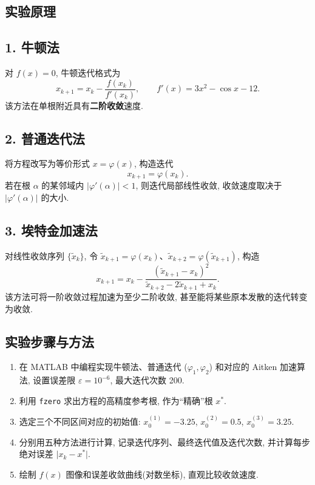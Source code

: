 \documentclass[12pt,a4paper]{ctexart}
\begin{document}
\subsection{实验原理}
\subsection*{1. 牛顿法}
对 $f(x)=0$, 牛顿迭代格式为
\begin{equation}
    x_{k+1}=x_k-\frac{f(x_k)}{f'(x_k)},\qquad f'(x)=3x^2-\cos x-12.
\end{equation}
该方法在单根附近具有\textbf{二阶收敛}速度. 

\subsection*{2. 普通迭代法}
将方程改写为等价形式 $x=\varphi(x)$, 构造迭代
\begin{equation}
    x_{k+1}=\varphi(x_k).
\end{equation}
若在根 $\alpha$ 的某邻域内 $\lvert\varphi'(\alpha)\rvert<1$, 则迭代局部线性收敛, 收敛速度取决于 $\lvert\varphi'(\alpha)\rvert$ 的大小. 

\subsection*{3. 埃特金加速法}
对线性收敛序列 $\{\tilde x_k\}$, 令 $\tilde x_{k+1}=\varphi(x_k)$、$\tilde x_{k+2}=\varphi(\tilde x_{k+1})$, 构造
\begin{equation}
    x_{k+1}=x_k-\frac{(\tilde x_{k+1}-x_k)^2}{\tilde x_{k+2}-2\tilde x_{k+1}+x_k}.
\end{equation}
该方法可将一阶收敛过程加速为至少二阶收敛, 甚至能将某些原本发散的迭代转变为收敛. 

\subsection{实验步骤与方法}
\begin{enumerate}[(1)]
    \item 在 MATLAB 中编程实现牛顿法、普通迭代 ($\varphi_1,\varphi_2$) 和对应的 Aitken 加速算法, 设置误差限 $\varepsilon=10^{-6}$, 最大迭代次数 200. 
    \item 利用 \texttt{fzero} 求出方程的高精度参考根, 作为“精确”根 $x^*$. 
    \item 选定三个不同区间对应的初始值: $x_0^{(1)}=-3.25$, $x_0^{(2)}=0.5$, $x_0^{(3)}=3.25$. 
    \item 分别用五种方法进行计算, 记录迭代序列、最终迭代值及迭代次数, 并计算每步绝对误差 $\lvert x_k-x^*\rvert$. 
    \item 绘制 $f(x)$ 图像和误差收敛曲线(对数坐标), 直观比较收敛速度. 
\end{enumerate}
\end{document}

